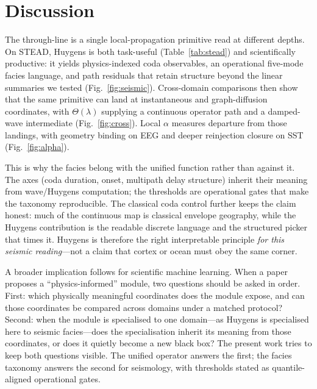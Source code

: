 \documentclass[twocolumn,10pt]{article}
\newcommand{\stead}{\textsc{STEAD}}
\begin{document}
\section*{Discussion}

The through-line is a single local-propagation primitive read at different
depths. On \stead{}, Huygens is both task-useful (Table~\ref{tab:stead}) and
scientifically productive: it yields physics-indexed coda observables, an
operational five-mode facies language, and path residuals that retain structure
beyond the linear summaries we tested (Fig.~\ref{fig:seismic}). Cross-domain
comparisons then show that the same primitive can land at instantaneous and
graph-diffusion coordinates, with \(\Theta(\lambda)\) supplying a continuous
operator path and a damped-wave intermediate (Fig.~\ref{fig:cross}). Local
\(\alpha\) measures departure from those landings, with geometry binding on EEG
and deeper reinjection closure on SST (Fig.~\ref{fig:alpha}).

This is why the facies belong with the unified function rather than against it.
The axes (coda duration, onset, multipath delay structure) inherit their meaning
from wave/Huygens computation; the thresholds are operational gates that make
the taxonomy reproducible. The classical coda control further keeps the claim
honest: much of the continuous map is classical envelope geography, while the
Huygens contribution is the readable discrete language and the structured
picker that times it. Huygens is therefore the right interpretable principle
\emph{for this seismic reading}---not a claim that cortex or ocean must obey
the same corner.

A broader implication follows for scientific machine learning. When a paper
proposes a ``physics-informed'' module, two questions should be asked in order.
First: which physically meaningful coordinates does the module expose, and can
those coordinates be compared across domains under a matched protocol? Second:
when the module is specialised to one domain---as Huygens is specialised here to
seismic facies---does the specialisation inherit its meaning from those
coordinates, or does it quietly become a new black box? The present work tries
to keep both questions visible. The unified operator answers the first; the
facies taxonomy answers the second for seismology, with thresholds stated as quantile-aligned operational gates.
\end{document}
